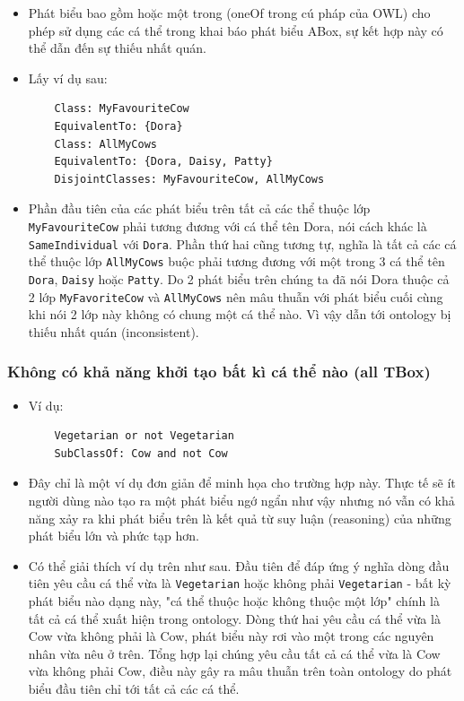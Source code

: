 \begin{itemize}
	\item 
	Phát biểu bao gồm hoặc một trong (oneOf trong cú pháp của OWL) cho phép sử dụng các cá thể trong khai báo phát biểu ABox, sự kết hợp này có thể dẫn đến sự thiếu nhất quán.
	\item
	Lấy ví dụ sau:
	\begin{verbatim}
	Class: MyFavouriteCow
	EquivalentTo: {Dora}
	Class: AllMyCows
	EquivalentTo: {Dora, Daisy, Patty}
	DisjointClasses: MyFavouriteCow, AllMyCows
	\end{verbatim}
	\item
	Phần đầu tiên của các phát biểu trên tất cả các thể thuộc lớp \texttt{MyFavouriteCow} phải tương đương với cá thể tên Dora, nói cách khác là \texttt{SameIndividual} với \texttt{Dora}. Phần thứ hai cũng tương tự, nghĩa là tất cả các cá thể thuộc lớp \texttt{AllMyCows} buộc phải tương đương với một trong 3 cá thể tên \texttt{Dora}, \texttt{Daisy} hoặc \texttt{Patty}. Do 2 phát biểu trên chúng ta đã nói Dora thuộc cả 2 lớp \texttt{MyFavoriteCow} và \texttt{AllMyCows} nên mâu thuẫn với phát biểu cuối cùng khi nói 2 lớp này không có chung một cá thể nào. Vì vậy dẫn tới ontology bị thiếu nhất quán (inconsistent).
\end{itemize}
\subsubsection{Không có khả năng khởi tạo bất kì cá thể nào (all TBox)}
\begin{itemize}
	\item Ví dụ:
	\begin{verbatim}
	Vegetarian or not Vegetarian
	SubClassOf: Cow and not Cow
	\end{verbatim}
	\item
	Đây chỉ là một ví dụ đơn giản để minh họa cho trường hợp này. Thực tế sẽ ít người dùng nào tạo ra một phát biểu ngớ ngẩn như vậy nhưng nó vẫn có khả năng xảy ra khi phát biểu trên là kết quả từ suy luận (reasoning) của những phát biểu lớn và phức tạp hơn.
	\item
	Có thể giải thích ví dụ trên như sau. Đầu tiên để đáp ứng ý nghĩa dòng đầu tiên yêu cầu cá thể vừa là \texttt{Vegetarian} hoặc không phải \texttt{Vegetarian} - bất kỳ phát biểu nào dạng này, "cá thể thuộc hoặc không thuộc một lớp" chính là tất cả cá thể xuất hiện trong ontology. Dòng thứ hai yêu cầu cá thể vừa là Cow vừa không phải là Cow, phát biểu này rơi vào một trong các nguyên nhân vừa nêu ở trên. Tổng hợp lại chúng yêu cầu tất cả cá thể vừa là Cow vừa không phải Cow, điều này gây ra mâu thuẫn trên toàn ontology do phát biểu đầu tiên chỉ tới tất cả các cá thể.
\end{itemize}

